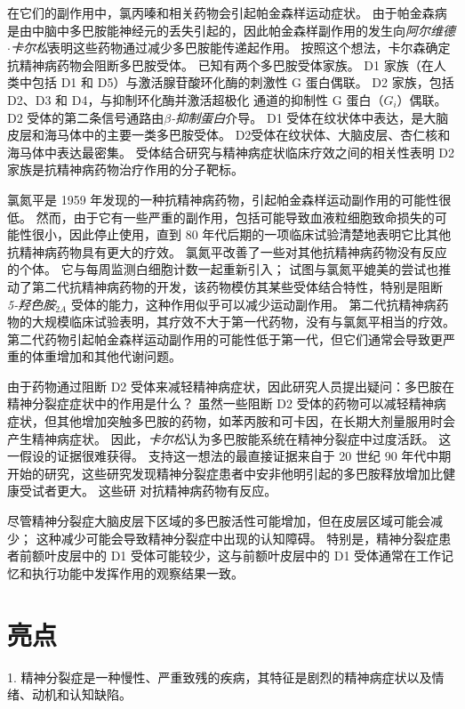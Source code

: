 在它们的副作用中，氯丙嗪和相关药物会引起帕金森样运动症状。
由于帕金森病是由中脑中多巴胺能神经元的丢失引起的，因此帕金森样副作用的发生向\textit{阿尔维德$\cdot$卡尔松}表明这些药物通过减少多巴胺能传递起作用。
按照这个想法，卡尔森确定抗精神病药物会阻断多巴胺受体。
已知有两个多巴胺受体家族。
D1 家族（在人类中包括 D1 和 D5）与激活腺苷酸环化酶的刺激性 G 蛋白偶联。
D2 家族，包括 D2、D3 和 D4，与抑制环化酶并激活超极化  通道的抑制性 G 蛋白（$ G_i $）偶联。
D2 受体的第二条信号通路由\textit{$\beta$-抑制蛋白}介导。
D1 受体在纹状体中表达，是大脑皮层和海马体中的主要一类多巴胺受体。
D2受体在纹状体、大脑皮层、杏仁核和海马体中表达最密集。
受体结合研究与精神病症状临床疗效之间的相关性表明 D2 家族是抗精神病药物治疗作用的分子靶标。


氯氮平是 1959 年发现的一种抗精神病药物，引起帕金森样运动副作用的可能性很低。
然而，由于它有一些严重的副作用，包括可能导致血液粒细胞致命损失的可能性很小，因此停止使用，直到 80 年代后期的一项临床试验清楚地表明它比其他抗精神病药物具有更大的疗效。
氯氮平改善了一些对其他抗精神病药物没有反应的个体。
它与每周监测白细胞计数一起重新引入；
试图与氯氮平媲美的尝试也推动了第二代抗精神病药物的开发，该药物模仿其某些受体结合特性，特别是阻断 \textit{5-羟色胺}$_{2A}$ 受体的能力，这种作用似乎可以减少运动副作用。
第二代抗精神病药物的大规模临床试验表明，其疗效不大于第一代药物，没有与氯氮平相当的疗效。
第二代药物引起帕金森样运动副作用的可能性低于第一代，但它们通常会导致更严重的体重增加和其他代谢问题。


由于药物通过阻断 D2 受体来减轻精神病症状，因此研究人员提出疑问：多巴胺在精神分裂症症状中的作用是什么？
虽然一些阻断 D2 受体的药物可以减轻精神病症状，但其他增加突触多巴胺的药物，如苯丙胺和可卡因，在长期大剂量服用时会产生精神病症状。
因此，\textit{卡尔松}认为多巴胺能系统在精神分裂症中过度活跃。
这一假设的证据很难获得。
支持这一想法的最直接证据来自于 20 世纪 90 年代中期开始的研究，这些研究发现精神分裂症患者中安非他明引起的多巴胺释放增加比健康受试者更大。
这些研 对抗精神病药物有反应。


尽管精神分裂症大脑皮层下区域的多巴胺活性可能增加，但在皮层区域可能会减少；
这种减少可能会导致精神分裂症中出现的认知障碍。
特别是，精神分裂症患者前额叶皮层中的 D1 受体可能较少，这与前额叶皮层中的 D1 受体通常在工作记忆和执行功能中发挥作用的观察结果一致。



\section{亮点}

1. 精神分裂症是一种慢性、严重致残的疾病，其特征是剧烈的精神病症状以及情绪、动机和认知缺陷。



